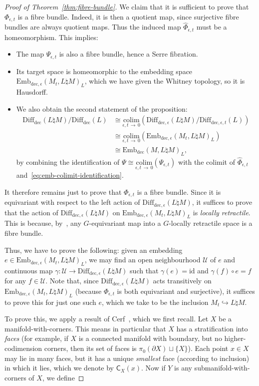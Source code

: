 \documentclass[AHL,Unicode,published]{cedram}
\newcommand{\id}{\mathrm{id}}
\newcommand{\colim}{\mathrm{colim}}
\newcommand{\rdec}{\mathrm{dec}}
\newcommand{\sC}{\mathsf{C}}
\newcommand{\cU}{\mathcal{U}}
\newcommand{\diffdec}{\ensuremath{\mathrm{Diff}_{\rdec}}}
\newcommand{\diffdece}{\ensuremath{\mathrm{Diff}_{\rdec,\epsilon}}}
\newcommand{\diffdecet}{\ensuremath{\mathrm{Diff}_{\rdec,\epsilon,t}}}
\newcommand{\embdec}{\ensuremath{\mathrm{Emb}_{\rdec}}}
\newcommand{\embdece}{\ensuremath{\mathrm{Emb}_{\rdec,\epsilon}}}
\begin{document}
\begin{proof}[Proof of Theorem~\ref{thm:fibre-bundle}]
We claim that it is sufficient to prove that $\Phi_{\epsilon,t}$ is a fibre bundle. Indeed, it is then a quotient map, since surjective fibre bundles are always quotient maps. Thus the induced map $\widehat{\Phi}_{\epsilon,t}$ must be a homeomorphism. This implies:
\begin{itemize}
\item[$\circ$] The map $\Psi_{\epsilon,t}$ is also a fibre bundle, hence a Serre fibration.
\item[$\circ$] Its target space is homeomorphic to the embedding space $\embdece(M_t,L\natural M)_L$, which we have given the Whitney topology, so it is Hausdorff.
\item[$\circ$] We also obtain the second statement of the proposition:
\begin{align*}
\diffdec(L \natural M) / \diffdec(L) &\cong
\underset{\epsilon,t\,\to\,0}{\colim}\left(\diffdece(L\natural M) / \diffdecet(L)\right) \\
&\cong \underset{\epsilon,t\,\to\,0}{\colim}\left(\embdece(M_t,L\natural M)_L\right) \\
&\cong \embdec(M,L\natural M)_L,
\end{align*}
by combining the identification of $\Psi \cong \underset{\epsilon,t\,\to\,0}{\colim}(\Psi_{\epsilon,t})$ with the colimit of $\widehat{\Phi}_{\epsilon,t}$ and~\eqref{eq:emb-colimit-identification}.
\end{itemize}

It therefore remains just to prove that $\Phi_{\epsilon,t}$ is a fibre bundle. Since it is equivariant with respect to the left action of $\diffdece(L\natural M)$, it suffices to prove that the action of $\diffdece(L\natural M)$ on $\embdece(M_t,L\natural M)_L$ is \emph{locally retractile}. This is because, by~\cite[Th.~A]{Palais1960Localtrivialityof}, any $G$-equivariant map into a $G$-locally retractile space is a fibre bundle.

Thus, we have to prove the following: given an embedding $e \in \embdece(M_t,L\natural M)_L$, we may find an open neighbourhood $\cU$ of $e$ and continuous map $\gamma \colon \cU \to \diffdece(L\natural M)$ such that $\gamma(e) = \id$ and $\gamma(f) \circ e = f$ for any $f \in \cU$. Note that, since $\diffdece(L\natural M)$ acts transitively on $\embdece(M_t,L\natural M)_L$ (because $\Phi_{\epsilon,t}$ is both equivariant and surjective), it suffices to prove this for just one such $e$, which we take to be the inclusion $M_t \hookrightarrow L \natural M$.

To prove this, we apply a result of Cerf~\cite[p.~291, Lem.~II.2.1.2]{Cerf1961Topologiedecertains}, which we first recall. Let $X$ be a manifold-with-corners. This means in particular that $X$ has a stratification into \emph{faces} (for example, if $X$ is a connected manifold with boundary, but no higher-codimension corners, then its set of faces is $\pi_{0}(\partial X) \sqcup \{X\}$). Each point $x \in X$ may lie in many faces, but it has a unique \emph{smallest} face (according to inclusion) in which it lies, which we denote by $\sC_{X}(x)$. Now if $Y$ is any submanifold-with-corners of $X$, we define


\end{proof}
\end{document}
